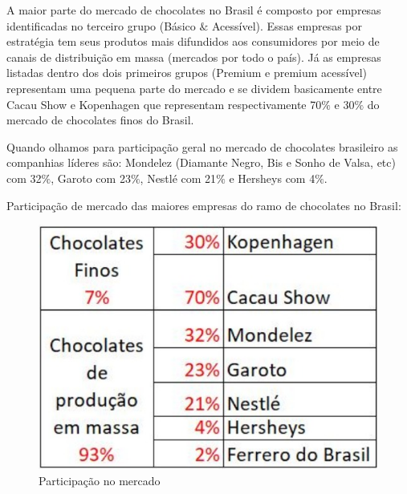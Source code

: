 \documentclass[
	12pt,				%
	openright,			%
	oneside,			%
	a4paper,			%
	english,			%
	french,				%
	spanish,			%
	brazil				%
	]{abntex2}
\begin{document}
A maior parte do mercado de chocolates no Brasil é composto por empresas identificadas no terceiro grupo (Básico $\&$ Acessível). Essas empresas por estratégia tem seus produtos mais difundidos aos consumidores por meio de canais de distribuição em massa (mercados por todo o país). Já as empresas listadas dentro dos dois primeiros grupos (Premium e premium acessível) representam uma pequena parte do mercado e se dividem basicamente entre Cacau Show e Kopenhagen que representam respectivamente 70$\%$ e 30$\%$ do mercado de chocolates finos do Brasil.

Quando olhamos para participação geral no mercado de chocolates brasileiro as companhias líderes são: Mondelez (Diamante Negro, Bis e Sonho de Valsa, etc) com 32$\%$, Garoto com 23$\%$, Nestlé com 21$\%$ e Hersheys com 4$\%$.

Participação de mercado das maiores empresas do ramo de chocolates no Brasil: 

\begin{figure}[H]
\begin{center}
\caption{Participação no mercado}
\includegraphics[scale=0.4]{concorrentes.jpeg} 
\end{center}
\end{figure}
\end{document}
